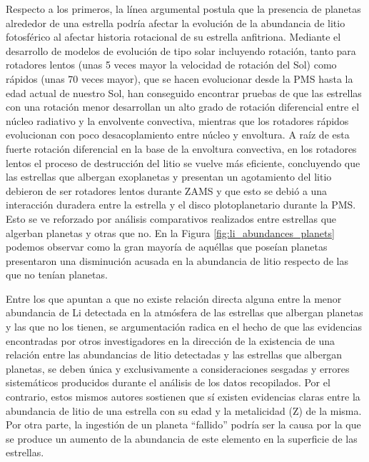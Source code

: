 Respecto a los primeros, la línea argumental postula que la presencia de planetas alrededor de una estrella podría afectar la evolución de la abundancia de litio fotosférico al afectar historia rotacional de su estrella anfitriona. Mediante el desarrollo de modelos de evolución de tipo solar incluyendo rotación, tanto para rotadores lentos (unas 5 veces mayor la velocidad de rotación del Sol) como rápidos (unas 70 veces mayor), que se hacen evolucionar desde la PMS hasta la edad actual de nuestro Sol, han conseguido encontrar pruebas de que las estrellas con una rotación menor desarrollan un alto grado de rotación diferencial entre el núcleo radiativo y la envolvente convectiva, mientras que los rotadores rápidos evolucionan con poco desacoplamiento entre núcleo y envoltura. A raíz de esta fuerte rotación diferencial en la base de la envoltura convectiva, en los rotadores lentos el proceso de destrucción del litio se vuelve más eficiente, concluyendo que las estrellas que albergan exoplanetas y presentan un agotamiento del litio debieron de ser rotadores lentos durante ZAMS y que esto se debió a una interacción duradera entre la estrella y el disco plotoplanetario durante la PMS. Esto se ve reforzado por análisis comparativos realizados entre estrellas que algerban planetas y otras que no. En la Figura \ref{fig:li_abundances_planets} podemos observar como la gran mayoría de aquéllas que poseían planetas presentaron una disminución acusada en la abundancia de litio respecto de las que no tenían planetas.\par

Entre los que apuntan a que no existe relación directa alguna entre la menor abundancia de Li detectada en la atmósfera de las estrellas que albergan planetas y las que no los tienen, se argumentación radica en el hecho de que las evidencias encontradas por otros investigadores en la dirección de la existencia de una relación entre las abundancias de litio detectadas y las estrellas que albergan planetas, se deben única y exclusivamente a consideraciones sesgadas y errores sistemáticos producidos durante el análisis de los datos recopilados. Por el contrario, estos mismos autores sostienen que sí existen evidencias claras entre la abundancia de litio de una estrella con su edad y la metalicidad (Z) de la misma. Por otra parte, la ingestión de un planeta “fallido” podría ser la causa por la que se produce un aumento de la abundancia de este elemento en la superficie de las estrellas.\par

